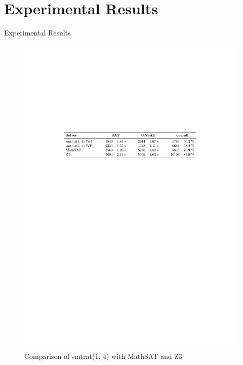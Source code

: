 \documentclass[]{beamer}
\begin{document}
\section{Experimental Results}
\begin{frame}{Experimental Results}
\begin{figure}
    \caption{Comparison of smtrat(1, 4) with MathSAT and Z3}
    \centering
    \includegraphics[scale=0.9]{../figures/ComparisonWithOthers.pdf}
\end{figure}
\end{frame}
\end{document}
